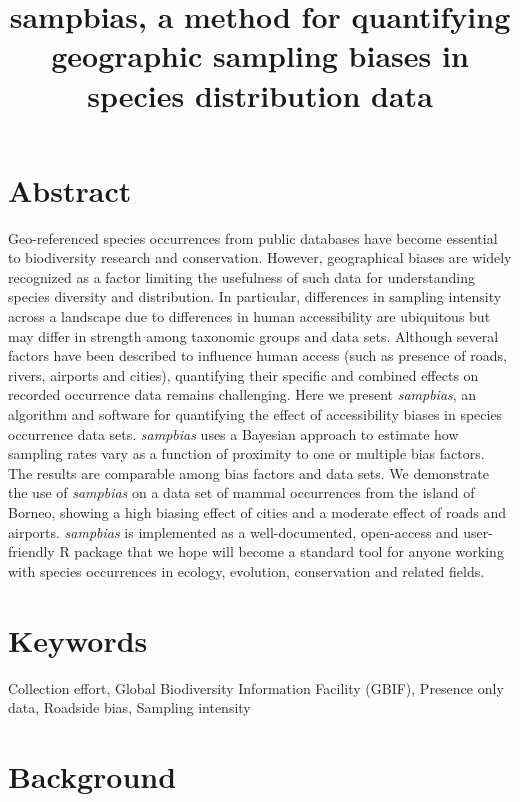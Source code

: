 \documentclass[
  12pt,
]{article}
\title{sampbias, a method for quantifying geographic sampling biases in species distribution data}
\author{}
\date{\vspace{-2.5em}}
\begin{document}
\maketitle

\newpage{}

\hypertarget{abstract}{%
\section{Abstract}\label{abstract}}

Geo-referenced species occurrences from public databases have become essential to biodiversity research and conservation. However, geographical biases are widely recognized as a factor limiting the usefulness of such data for understanding species diversity and distribution. In particular, differences in sampling intensity across a landscape due to differences in human accessibility are ubiquitous but may differ in strength among taxonomic groups and data sets. Although several factors have been described to influence human access (such as presence of roads, rivers, airports and cities), quantifying their specific and combined effects on recorded occurrence data remains challenging. Here we present \emph{sampbias}, an algorithm and software for quantifying the effect of accessibility biases in species occurrence data sets. \emph{sampbias} uses a Bayesian approach to estimate how sampling rates vary as a function of proximity to one or multiple bias factors. The results are comparable among bias factors and data sets. We demonstrate the use of \emph{sampbias} on a data set of mammal occurrences from the island of Borneo, showing a high biasing effect of cities and a moderate effect of roads and airports. \emph{sampbias} is implemented as a well-documented, open-access and user-friendly R package that we hope will become a standard tool for anyone working with species occurrences in ecology, evolution, conservation and related fields.

\hypertarget{keywords}{%
\section{Keywords}\label{keywords}}

Collection effort, Global Biodiversity Information Facility (GBIF), Presence only data, Roadside bias, Sampling intensity

\newpage{}

\hypertarget{background}{%
\section{Background}\label{background}}
\end{document}

